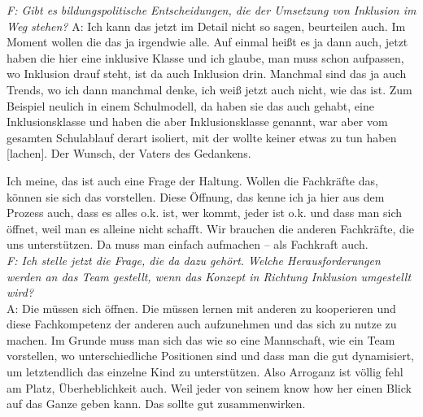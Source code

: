 \begin{linenumbers*}
\emph{F: Gibt es bildungspolitische Entscheidungen, die der Umsetzung von Inklusion im Weg stehen?} 
A: Ich kann das jetzt im Detail nicht so sagen, beurteilen auch. Im Moment
wollen die das ja irgendwie alle. Auf einmal heißt es ja dann auch, jetzt haben
die hier eine inklusive Klasse und ich glaube, man muss schon aufpassen, wo
Inklusion drauf steht, ist da auch Inklusion drin. Manchmal sind das ja auch
Trends, wo ich dann manchmal denke, ich weiß jetzt auch nicht, wie das ist. Zum
Beispiel neulich in einem Schulmodell, da haben sie das auch gehabt, eine
Inklusionsklasse und haben die aber Inklusionsklasse genannt, war aber vom
gesamten Schulablauf derart isoliert, mit der wollte keiner etwas zu tun haben
{[lachen]}. Der Wunsch, der Vaters des Gedankens. 

Ich meine, das ist auch eine Frage der Haltung. Wollen die Fachkräfte das, können sie sich das vorstellen. Diese Öffnung, das kenne ich ja hier aus dem Prozess auch, dass es alles o.k. ist, wer kommt, jeder ist o.k. und dass man sich öffnet, weil man es alleine nicht schafft. Wir brauchen die anderen Fachkräfte, die uns unterstützen. Da muss man einfach aufmachen -- als Fachkraft auch.\\
\emph{F: Ich stelle jetzt die Frage, die da dazu gehört. Welche Herausforderungen werden an das Team gestellt, wenn das Konzept in Richtung Inklusion umgestellt wird?}\\
A: Die müssen sich öffnen. Die müssen lernen mit anderen zu kooperieren und diese Fachkompetenz der anderen auch aufzunehmen und das sich zu nutze zu machen. Im Grunde muss man sich das wie so eine Mannschaft, wie ein Team vorstellen, wo unterschiedliche Positionen sind und dass man die gut dynamisiert, um letztendlich das einzelne Kind zu unterstützen. Also Arroganz ist völlig fehl am Platz, Überheblichkeit auch. Weil jeder von seinem know how her einen Blick auf das Ganze geben kann. Das sollte gut zusammenwirken.


\end{linenumbers*}
